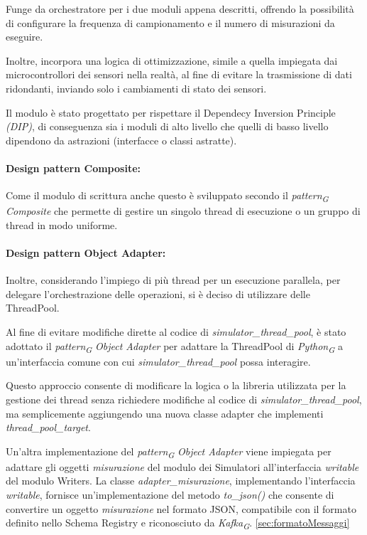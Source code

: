 Funge da orchestratore per i due moduli appena descritti, offrendo la possibilità di configurare la frequenza di campionamento e il numero di misurazioni da eseguire.

Inoltre, incorpora una logica di ottimizzazione, simile a quella impiegata dai microcontrollori dei sensori nella realtà, al fine di evitare la trasmissione di dati ridondanti, inviando solo i cambiamenti di stato dei sensori.

Il modulo è stato progettato per rispettare il Dependecy Inversion Principle \textit{(DIP)}, di conseguenza sia i moduli di alto livello che quelli di basso livello dipendono da astrazioni (interfacce o classi astratte).

\paragraph{Design pattern Composite:}
Come il modulo di scrittura anche questo è sviluppato secondo il \textit{pattern}\textsubscript{\textit{G}} \textit{Composite} che permette di gestire un singolo thread di esecuzione o un gruppo di thread in modo uniforme.

\paragraph{Design pattern Object Adapter:}
Inoltre, considerando l'impiego di più thread per un esecuzione parallela, per delegare l'orchestrazione delle operazioni, si è deciso di utilizzare delle ThreadPool.

Al fine di evitare modifiche dirette al codice di \textit{simulator\_thread\_pool}, è stato adottato il \textit{pattern}\textsubscript{\textit{G}} \textit{Object Adapter} per adattare la ThreadPool di \textit{Python}\textsubscript{\textit{G}} a un'interfaccia comune con cui \textit{simulator\_thread\_pool} possa interagire.

Questo approccio consente di modificare la logica o la libreria utilizzata per la gestione dei thread senza richiedere modifiche al codice di \textit{simulator\_thread\_pool}, ma semplicemente aggiungendo una nuova classe adapter che implementi \textit{thread\_pool\_target}.

Un'altra implementazione del \textit{pattern}\textsubscript{\textit{G}} \textit{Object Adapter} viene impiegata per adattare gli oggetti \textit{misurazione} del modulo dei Simulatori all'interfaccia \textit{writable} del modulo Writers. La classe \textit{adapter\_misurazione}, implementando l'interfaccia \textit{writable}, fornisce un'implementazione del metodo \textit{to\_json()} che consente di convertire un oggetto \textit{misurazione} nel formato JSON, compatibile con il formato definito nello Schema Registry e riconosciuto da \textit{Kafka}\textsubscript{\textit{G}}.
\ref{sec:formatoMessaggi}

